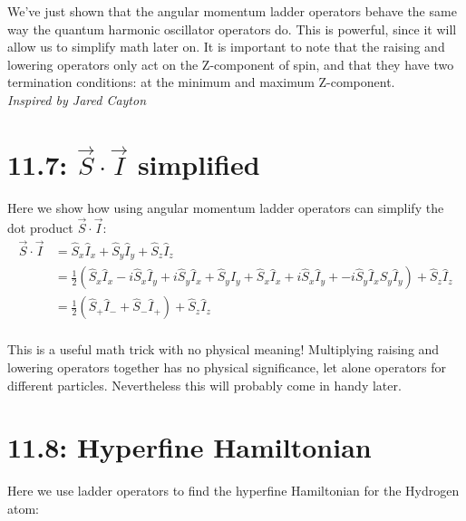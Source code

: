\documentclass[10pt]{article} %
\begin{document}
We've just shown that the angular momentum ladder operators behave the same way the quantum
harmonic oscillator operators do. This is powerful, since it will allow us to simplify math
later on. It is important to note that the raising and lowering operators only act on the
Z-component of spin, and that they have two termination conditions: at the minimum and
maximum Z-component.\\

\textit{Inspired by Jared Cayton}\\

\section{11.7: $\vec{S} \cdot \vec{I}$ simplified}

Here we show how using angular momentum ladder operators can simplify the dot product
$\vec{S} \cdot \vec{I}$:\\

\begin{align*}
  \vec{S} \cdot \vec{I} &= \hat{S}_x\hat{I}_x + \hat{S}_y\hat{I}_y + \hat{S}_z\hat{I}_z\\
  &= \frac{1}{2}\left(\hat{S}_x\hat{I}_x -i\hat{S}_x\hat{I}_y + i\hat{S}_y\hat{I}_x
  + \hat{S}_y\hat{I}_y + \hat{S}_x\hat{I}_x + i\hat{S}_x\hat{I}_y
  + -i\hat{S}_y\hat{I}_x\hat{S}_y\hat{I}_y\right)
  + \hat{S}_z\hat{I}_z\\
  &= \frac{1}{2}\left(\hat{S}_+\hat{I}_- + \hat{S}_-\hat{I}_+\right) + \hat{S}_z\hat{I}_z\\
\end{align*}

This is a useful math trick with no physical meaning! Multiplying raising and lowering operators
together has no physical significance, let alone operators for different particles. Nevertheless
this will probably come in handy later.\\

\section{11.8: Hyperfine Hamiltonian}
Here we use ladder operators to find the hyperfine Hamiltonian for the Hydrogen atom:\\
\end{document}
